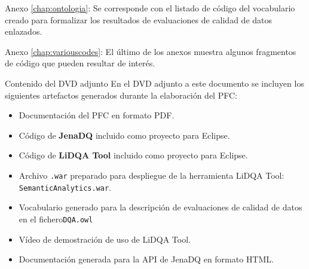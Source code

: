 \begin{definitionlist}
\item[Anexo \ref{chap:ontologia}: \nameref{chap:ontologia}] Se
  corresponde con el listado de código del vocabulario creado para formalizar
  los resultados de evaluaciones de calidad de datos enlazados. 

\item[Anexo \ref{chap:variouscodes}: \nameref{chap:variouscodes}] El último de
  los anexos muestra algunos fragmentos de código que pueden resultar de
  interés. 

\item[Contenido del \acs{DVD} adjunto] En el \acs{DVD} adjunto a este documento
  se incluyen los siguientes artefactos generados durante la elaboración del
  \acs{PFC}: 
  \begin{itemize}
  \item Documentación del \acs{PFC} en formato \acs{PDF}.
  \item Código de \textbf{JenaDQ} incluido como proyecto para Eclipse. 
  \item Código de \textbf{LiDQA Tool} incluido como proyecto para Eclipse. 
  \item Archivo \texttt{.war} preparado para despliegue de la herramienta
    LiDQA Tool: \texttt{SemanticAnalytics.war}. 
  \item Vocabulario generado para la descripción de
    evaluaciones de calidad de datos en el fichero\texttt{DQA.owl} 
  \item Vídeo de demostración de uso de LiDQA Tool. 
  \item Documentación generada para la \acs{API} de JenaDQ en formato \acs{HTML}. 
  \end{itemize}

\end{definitionlist}




